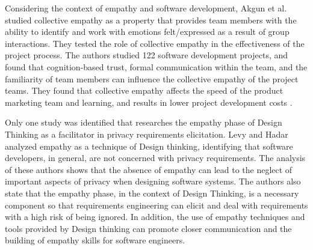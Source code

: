 \documentclass[conference]{IEEEtran}
\begin{document}
Considering the context of empathy and software development, Akgun et al. \cite{DBLP:journals/iam/AkgunKCD15} studied collective empathy as a property that provides team members with the ability to identify and work with emotions felt/expressed as a result of group interactions. They tested the role of collective empathy in the effectiveness of the project process. The authors studied 122 software development projects, and found that cognition-based trust, formal communication within the team, and the familiarity of team members can influence the collective empathy of the project teams. They found that collective empathy affects the speed of the product marketing team and learning, and results in lower project development costs \cite{DBLP:journals/iam/AkgunKCD15}.


Only one study was identified that researches the empathy phase of Design Thinking as a facilitator in privacy requirements elicitation. Levy and Hadar \cite{DBLP:conf/re/LevyH18} analyzed empathy as a technique of Design thinking, identifying that software developers, in general, are not concerned with privacy requirements. The analysis of these authors shows that the absence of empathy can lead to the neglect of important aspects of privacy when designing software systems. The authors also state that the empathy phase, in the context of Design Thinking, is a necessary component so that requirements engineering can elicit and deal with requirements with a high risk of being ignored. In addition, the use of empathy techniques and tools provided by Design thinking can promote closer communication and the building of empathy skills for software engineers.
\end{document}
